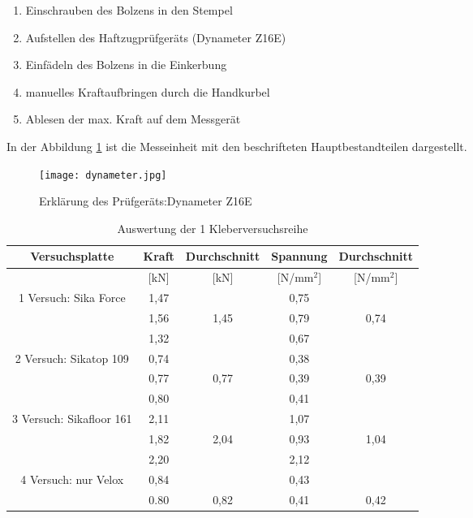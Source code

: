 \documentclass[12 pt,a4 paper ]{scrreprt}
\begin{document}
\begin{enumerate}
\item Einschrauben des Bolzens in den Stempel
\item Aufstellen des Haftzugprüfgeräts (Dynameter Z16E)
\item Einfädeln des Bolzens in die Einkerbung
\item manuelles Kraftaufbringen durch die Handkurbel
\item Ablesen der max. Kraft auf dem Messgerät
\end{enumerate}

In der Abbildung \ref{dynameter} ist die Messeinheit mit den beschrifteten Hauptbestandteilen dargestellt. 

\begin{figure}
\begin{center}
\texttt{[image: dynameter.jpg]}
\caption{ Erklärung des Prüfgeräts:Dynameter Z16E}
\label{dynameter}
\end{center}
\end{figure}



\begin{table}
\caption{Auswertung der 1 Kleberversuchsreihe}
\begin{center}

\begin{tabular}{|c|c|c|c|c|} \hline
Versuchsplatte & Kraft & Durchschnitt & Spannung &Durchschnitt \\\hline

	& [kN] & [kN] & [N/mm$^{2}$] & [N/mm$^{2}$] \\
	\hline\hline
 \cline{2-2} 1 Versuch: Sika Force  & 1,47 & & 0,75& \\\cline{2-2}&1,56 &1,45 &0,79 &0,74 \\\cline{2-2}&1,32 & &0,67 & 
\\\hline\hline

 \cline{2-2} 2 Versuch: Sikatop 109  & 0,74 & & 0,38& \\\cline{2-2}&0,77 &0,77 &0,39 &0,39 \\\cline{2-2}&0,80 & &0,41 & 
\\\hline\hline

 \cline{2-2} 3 Versuch: Sikafloor 161  & 2,11 & & 1,07& \\\cline{2-2}&1,82 &2,04 &0,93 &1,04 \\\cline{2-2}&2,20 & &2,12 & 
\\\hline\hline


 \cline{2-2} 4 Versuch: nur Velox  & 0,84 & & 0,43& \\\cline{2-2}&0.80 &0,82 &0,41 &0,42 
\\\hline

\end{tabular}
 \label{tab:1 kleberversuche}

\end{center}
\end{table}
\end{document}
